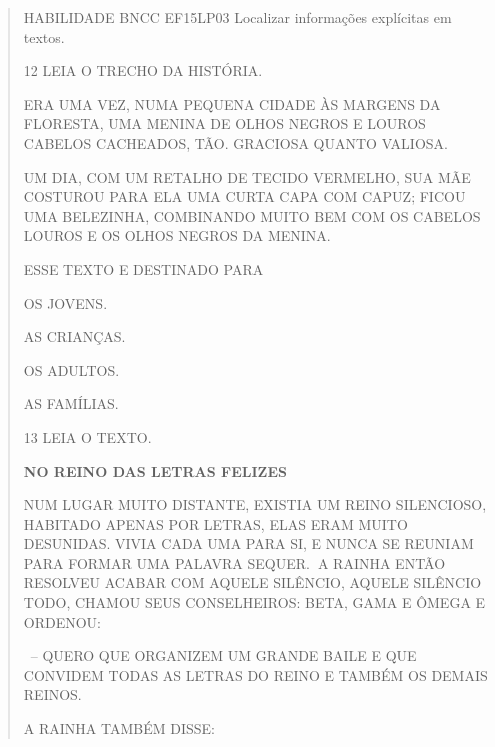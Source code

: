 \begin{escola}
{\begin{verse}
{HABILIDADE BNCC EF15LP03 Localizar informações explícitas em textos.}



\num{12} LEIA O TRECHO DA HISTÓRIA.


ERA UMA VEZ, NUMA PEQUENA CIDADE ÀS MARGENS DA FLORESTA,
UMA MENINA DE OLHOS NEGROS E LOUROS CABELOS CACHEADOS, TÃO.
GRACIOSA QUANTO VALIOSA.

UM DIA, COM UM RETALHO DE TECIDO VERMELHO, SUA MÃE
COSTUROU PARA ELA UMA CURTA CAPA COM CAPUZ; FICOU UMA
BELEZINHA, COMBINANDO MUITO BEM COM OS CABELOS LOUROS E
OS OLHOS NEGROS DA MENINA.


ESSE TEXTO E DESTINADO PARA

\begin{escolha}
\item OS JOVENS.

\item AS CRIANÇAS.

\item OS ADULTOS.

\item AS FAMÍLIAS.
\end{escolha}


\num{13} LEIA O TEXTO.

\textbf{NO REINO DAS LETRAS FELIZES}

NUM LUGAR MUITO DISTANTE, EXISTIA UM REINO SILENCIOSO, HABITADO APENAS
POR LETRAS, ELAS ERAM MUITO DESUNIDAS. VIVIA CADA UMA PARA SI, E NUNCA
SE REUNIAM PARA FORMAR UMA PALAVRA SEQUER.\textbf{~}A RAINHA ENTÃO
RESOLVEU ACABAR COM AQUELE SILÊNCIO, AQUELE SILÊNCIO TODO, CHAMOU SEUS
CONSELHEIROS: BETA, GAMA E ÔMEGA E ORDENOU:

~-- QUERO QUE ORGANIZEM UM GRANDE BAILE E QUE CONVIDEM TODAS AS LETRAS
DO REINO E TAMBÉM OS DEMAIS REINOS.

A RAINHA TAMBÉM DISSE:


\end{verse}}
\end{escola}
